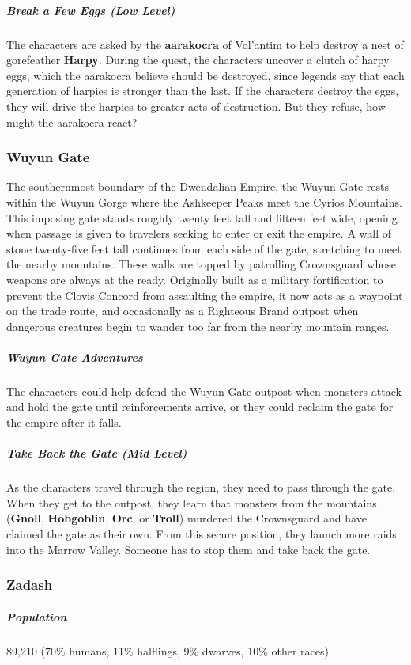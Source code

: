 \documentclass[10pt,a4paper,twoside,bg=print,twocolumn,openany,nodeprecatedcode]{dndbook}
\begin{document}
\subparagraph{Break a Few Eggs (Low Level)}
The characters are asked by the \textbf{aarakocra} of Vol'antim to help destroy a nest of gorefeather \textbf{Harpy}. During the quest, the characters uncover a clutch of harpy eggs, which the aarakocra believe should be destroyed, since legends say that each generation of harpies is stronger than the last. If the characters destroy the eggs, they will drive the harpies to greater acts of destruction. But they refuse, how might the aarakocra react?

\subsubsection{Wuyun Gate}
The southernmost boundary of the Dwendalian Empire, the Wuyun Gate rests within the Wuyun Gorge where the Ashkeeper Peaks meet the Cyrios Mountains. This imposing gate stands roughly twenty feet tall and fifteen feet wide, opening when passage is given to travelers seeking to enter or exit the empire. A wall of stone twenty-five feet tall continues from each side of the gate, stretching to meet the nearby mountains. These walls are topped by patrolling Crownsguard whose weapons are always at the ready. Originally built as a military fortification to prevent the Clovis Concord from assaulting the empire, it now acts as a waypoint on the trade route, and occasionally as a Righteous Brand outpost when dangerous creatures begin to wander too far from the nearby mountain ranges.

\subparagraph{Wuyun Gate Adventures}
The characters could help defend the Wuyun Gate outpost when monsters attack and hold the gate until reinforcements arrive, or they could reclaim the gate for the empire after it falls.

\subparagraph{Take Back the Gate (Mid Level)}
As the characters travel through the region, they need to pass through the gate. When they get to the outpost, they learn that monsters from the mountains (\textbf{Gnoll}, \textbf{Hobgoblin}, \textbf{Orc}, or \textbf{Troll}) murdered the Crownsguard and have claimed the gate as their own. From this secure position, they launch more raids into the Marrow Valley. Someone has to stop them and take back the gate.

\subsubsection{Zadash}
\subparagraph{Population}
89,210 (70\% humans, 11\% halflings, 9\% dwarves, 10\% other races)
\end{document}
